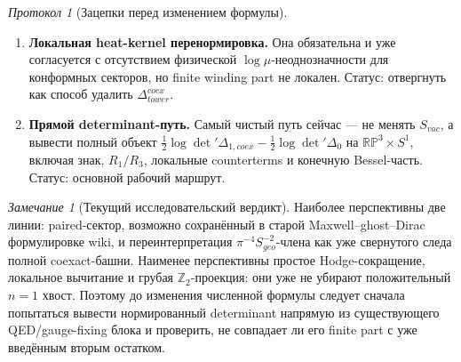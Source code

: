 \documentclass[12pt,a4paper]{report}
\theoremstyle{remark}
\newtheorem{remark}{Замечание}[chapter]
\newtheorem{protocol}{Протокол}[chapter]
\begin{document}
\begin{protocol}[Зацепки перед изменением формулы]
\begin{enumerate}
    \item \textbf{Локальная heat-kernel перенормировка.} Она обязательна и уже согласуется с отсутствием физической \(\log\mu\)-неоднозначности для конформных секторов, но finite winding part не локален. Статус: отвергнуть как способ удалить \(\Delta_{tower}^{coex}\).
    \item \textbf{Прямой determinant-путь.} Самый чистый путь сейчас --- не менять \(S_{vac}\), а вывести полный объект \(\frac12\log\det\prime\Delta_{1,coex}-\frac12\log\det\prime\Delta_0\) на \(\mathbb{RP}^3\times S^1\), включая знак, \(R_1/R_3\), локальные counterterms и конечную Bessel-часть. Статус: основной рабочий маршрут.
\end{enumerate}
\end{protocol}

\begin{remark}[Текущий исследовательский вердикт]
Наиболее перспективны две линии: paired-сектор, возможно сохранённый в старой Maxwell--ghost--Dirac формулировке wiki, и переинтерпретация \(\pi^{-4}S_{geo}^{-2}\)-члена как уже свернутого следа полной coexact-башни. Наименее перспективны простое Hodge-сокращение, локальное вычитание и грубая \(\mathbb Z_2\)-проекция: они уже не убирают положительный \(n=1\) хвост. Поэтому до изменения численной формулы следует сначала попытаться вывести нормированный determinant напрямую из существующего QED/gauge-fixing блока и проверить, не совпадает ли его finite part с уже введённым вторым остатком.
\end{remark}
\end{document}
